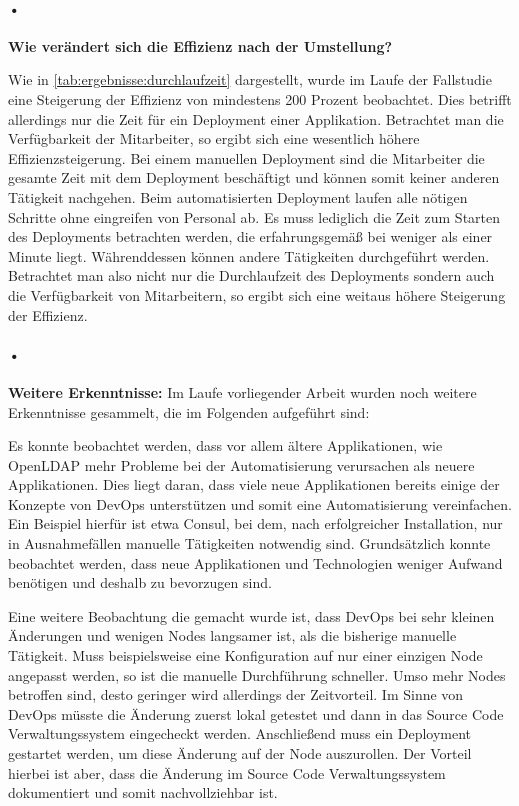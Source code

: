 	
\paragraph{•}
\textbf{Wie verändert sich die Effizienz nach der Umstellung?}

Wie in \autoref{tab:ergebnisse:durchlaufzeit} dargestellt, wurde im Laufe der Fallstudie eine Steigerung der Effizienz von mindestens 200 Prozent beobachtet. Dies betrifft allerdings nur die Zeit für ein Deployment einer Applikation. Betrachtet man die Verfügbarkeit der Mitarbeiter, so ergibt sich eine wesentlich höhere Effizienzsteigerung. Bei einem manuellen Deployment sind die Mitarbeiter die gesamte Zeit mit dem Deployment beschäftigt und können somit keiner anderen Tätigkeit nachgehen. Beim automatisierten Deployment laufen alle nötigen Schritte ohne eingreifen von Personal ab. Es muss lediglich die Zeit zum Starten des Deployments betrachten werden, die erfahrungsgemäß bei weniger als einer Minute liegt. Währenddessen können andere Tätigkeiten durchgeführt werden. Betrachtet man also nicht nur die Durchlaufzeit des Deployments sondern auch die Verfügbarkeit von Mitarbeitern, so ergibt sich eine weitaus höhere Steigerung der Effizienz.


\paragraph{•}
\textbf{Weitere Erkenntnisse:} Im Laufe vorliegender Arbeit wurden noch weitere Erkenntnisse gesammelt, die im Folgenden aufgeführt sind:

Es konnte beobachtet werden, dass vor allem ältere Applikationen, wie OpenLDAP mehr Probleme bei der Automatisierung verursachen als neuere Applikationen. Dies liegt daran, dass viele neue Applikationen bereits einige der Konzepte von DevOps unterstützen und somit eine Automatisierung vereinfachen. Ein Beispiel hierfür ist etwa Consul, bei dem, nach erfolgreicher Installation, nur in Ausnahmefällen manuelle Tätigkeiten notwendig sind. Grundsätzlich konnte beobachtet werden, dass neue Applikationen und Technologien weniger Aufwand benötigen und deshalb zu bevorzugen sind.

Eine weitere Beobachtung die gemacht wurde ist, dass DevOps bei sehr kleinen Änderungen und wenigen Nodes langsamer ist, als die bisherige manuelle Tätigkeit. Muss beispielsweise eine Konfiguration auf nur einer einzigen Node angepasst werden, so ist die manuelle Durchführung schneller. Umso mehr Nodes betroffen sind, desto geringer wird allerdings der Zeitvorteil. Im Sinne von DevOps müsste die Änderung zuerst lokal getestet und dann in das Source Code Verwaltungssystem eingecheckt werden. Anschließend muss ein Deployment gestartet werden, um diese Änderung auf der Node auszurollen. Der Vorteil hierbei ist aber, dass die Änderung im Source Code Verwaltungssystem dokumentiert und somit nachvollziehbar ist.

